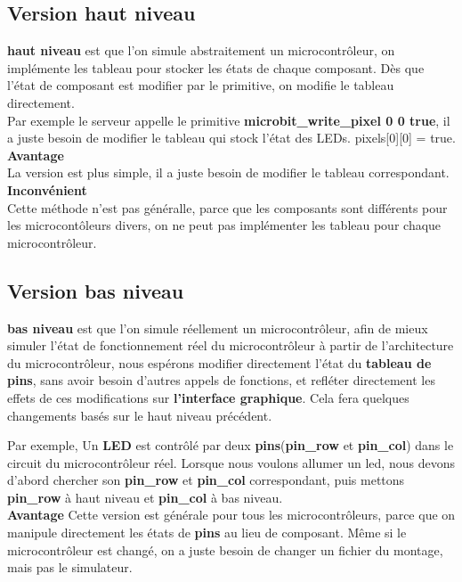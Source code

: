 \documentclass[14px]{article}
\begin{document}
\subsection{Version haut niveau}
\textbf{haut niveau} est que l'on simule abstraitement un microcontrôleur, on implémente les tableau pour stocker les états de chaque composant. Dès que l'état de composant est modifier par le primitive, on modifie le tableau directement.\\
Par exemple le serveur appelle le primitive \textbf{microbit\_write\_pixel 0 0 true}, il a juste besoin de modifier le tableau qui stock l'état des LEDs. pixels[0][0] = true.\\

\textbf{Avantage}\\
La version est plus simple, il a juste besoin de modifier le tableau correspondant.\\

\textbf{Inconvénient}\\
Cette méthode n'est pas généralle, parce que les composants sont différents pour les microcontôleurs divers, on ne peut pas implémenter les tableau pour chaque microcontrôleur.

\subsection{Version bas niveau}
\textbf{bas niveau} est que l'on simule réellement un microcontrôleur, afin de mieux simuler l'état de fonctionnement réel du microcontrôleur à partir de l'architecture du microcontrôleur, nous espérons modifier directement l'état du \textbf{tableau de pins}, sans avoir besoin d'autres appels de fonctions, et refléter directement les effets de ces modifications sur \textbf{l'interface graphique}. Cela fera quelques changements basés sur le haut niveau précédent.

Par exemple, Un \textbf{LED} est contrôlé par deux \textbf{pins}(\textbf{pin\_row} et \textbf{pin\_col}) dans le circuit du microcontrôleur réel. Lorsque nous voulons allumer un led, nous devons d'abord chercher son \textbf{pin\_row} et \textbf{pin\_col} correspondant, puis mettons \textbf{pin\_row} à haut niveau et \textbf{pin\_col} à bas niveau.\\

\textbf{Avantage}
Cette version est générale pour tous les microcontrôleurs, parce que on manipule directement les états de \textbf{pins} au lieu de composant. Même si le microcontrôleur est changé, on a juste besoin de changer un fichier du montage, mais pas le simulateur.\\
\end{document}

